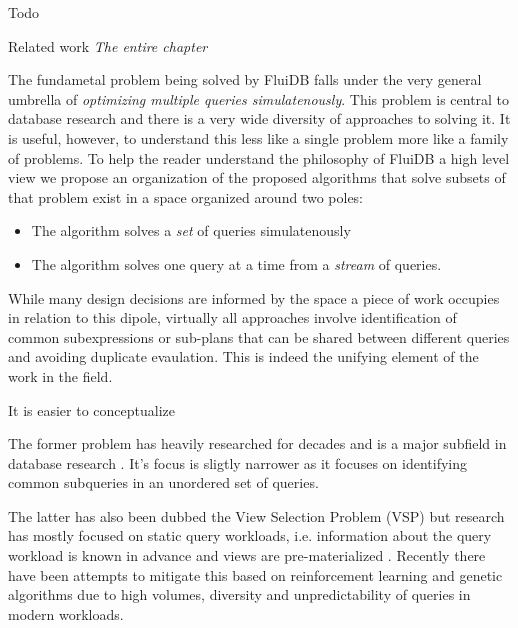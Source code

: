 
\begin{summary}
\item Todo
\end{summary}

\begin{correction}{Related work}
  \emph{The entire chapter}
\end{correction}

The fundametal problem being solved by FluiDB falls under the very
general umbrella of \emph{optimizing multiple queries simulatenously}. This
problem is central to database research and there is a very wide
diversity of approaches to solving it. It is useful, however, to
understand this less like a single problem more like a family of
problems. To help the reader understand the philosophy of FluiDB a
high level view we propose an organization of the proposed algorithms
that solve subsets of that problem exist in a space organized around
two poles:

\begin{itemize}
\item The algorithm solves a \emph{set} of queries simulatenously
\item The algorithm solves one query at a time from a \emph{stream} of queries.
\end{itemize}

While many design decisions are informed by the space a piece of work
occupies in relation to this dipole, virtually all approaches involve
identification of common subexpressions or sub-plans that can be
shared between different queries and avoiding duplicate
evaulation. This is indeed the unifying element of the work in the
field.

It is easier to conceptualize

The former problem has heavily researched for decades and is a major
 subfield in database research
 \cite{sellisMultipleQueryOptimization1987,royEfficientExtensibleAlgorithms2000,ComputingQueriesDerived}. It's
 focus is sligtly narrower as it focuses on identifying common
 subqueries in an unordered set of queries.

The latter has also been dubbed the View Selection Problem (VSP) but
research has mostly focused on static query workloads,
i.e. information about the query workload is known in advance and
views are pre-materialized
\cite{phanDynamicMaterializationQuery2008a}. Recently there have been
attempts to mitigate this based on reinforcement learning and genetic
algorithms due to high volumes, diversity and unpredictability of
queries in modern workloads.

